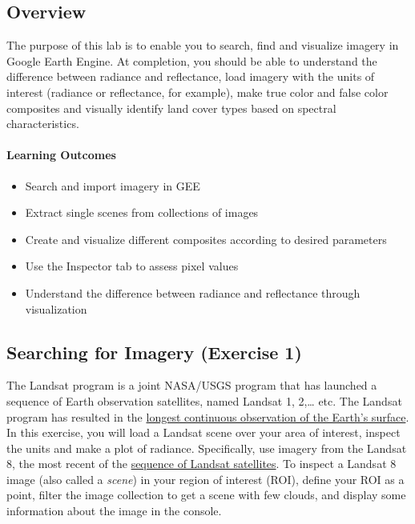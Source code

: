\documentclass[
]{article}
\providecommand{\tightlist}{%
  \setlength{\itemsep}{0pt}\setlength{\parskip}{0pt}}
\begin{document}
\hypertarget{overview-2}{%
\subsection*{Overview}\label{overview-2}}

The purpose of this lab is to enable you to search, find and visualize imagery in Google Earth Engine. At completion, you should be able to understand the difference between radiance and reflectance, load imagery with the units of interest (radiance or reflectance, for example), make true color and false color composites and visually identify land cover types based on spectral characteristics.

\hypertarget{learning-outcomes-2}{%
\paragraph{Learning Outcomes}\label{learning-outcomes-2}}

\begin{itemize}
\tightlist
\item
  Search and import imagery in GEE
\item
  Extract single scenes from collections of images
\item
  Create and visualize different composites according to desired parameters
\item
  Use the Inspector tab to assess pixel values
\item
  Understand the difference between radiance and reflectance through visualization
\end{itemize}

\hypertarget{searching-for-imagery-exercise-1}{%
\subsection{Searching for Imagery (Exercise 1)}\label{searching-for-imagery-exercise-1}}

The Landsat program is a joint NASA/USGS program that has launched a sequence of Earth observation satellites, named Landsat 1, 2,\ldots{} etc. The Landsat program has resulted in the \href{https://www.youtube.com/embed/ZZx1xmNGcXI?list=PLD240BBC85537B9BE}{longest continuous observation of the Earth's surface}. In this exercise, you will load a Landsat scene over your area of interest, inspect the units and make a plot of radiance. Specifically, use imagery from the Landsat 8, the most recent of the \href{https://www.usgs.gov/core-science-systems/nli/landsat/landsat-8}{sequence of Landsat satellites}. To inspect a Landsat 8 image (also called a \emph{scene}) in your region of interest (ROI), define your ROI as a point, filter the image collection to get a scene with few clouds, and display some information about the image in the console.
\end{document}

